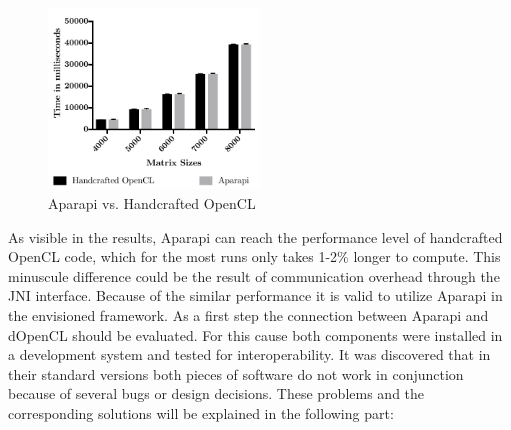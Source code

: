 \begin{figure}[H]
	\includegraphics[width=0.5\textwidth]{images/aparapivsopencl.pdf}
	\centering
	\caption{Aparapi vs. Handcrafted OpenCL}
	\label{img:aparapi_vs_opencl}
\end{figure}

As visible in the results, Aparapi can reach the performance level of handcrafted OpenCL code, which for the most runs only takes 1-2\% longer to compute. This minuscule difference could be the result of communication overhead through the JNI interface. Because of the similar performance it is valid to utilize Aparapi in the envisioned framework. As a first step the connection between Aparapi and dOpenCL should be evaluated. For this cause both components were installed in a development system and tested for interoperability. It was discovered that in their standard versions both pieces of software do not work in conjunction because of several bugs or design decisions. These problems and the corresponding solutions will be explained in the following part:

